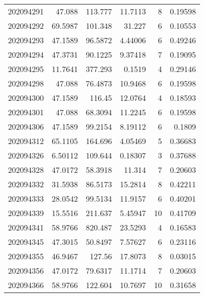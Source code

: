 \begin{tabular}{rrrrrr}
 202094291 &         47.088   &      113.777  &           11.7113  &           8 & 0.19598 \\
 202094292 &         69.5987  &      101.348  &           31.227   &           6 & 0.10553 \\
 202094293 &         47.1589  &       96.5872 &            4.44006 &           6 & 0.49246 \\
 202094294 &         47.3731  &       90.1225 &            9.37418 &           7 & 0.19095 \\
 202094295 &         11.7641  &      377.293  &            0.1519  &           4 & 0.29146 \\
 202094298 &         47.088   &       76.4873 &           10.9468  &           6 & 0.19598 \\
 202094300 &         47.1589  &      116.45   &           12.0764  &           4 & 0.18593 \\
 202094301 &         47.088   &       68.3094 &           11.2245  &           6 & 0.19598 \\
 202094306 &         47.1589  &       99.2154 &            8.19112 &           6 & 0.1809  \\
 202094312 &         65.1105  &      164.696  &            4.05469 &           5 & 0.36683 \\
 202094326 &          6.50112 &      109.644  &            0.18307 &           3 & 0.37688 \\
 202094328 &         47.0172  &       58.3918 &           11.314   &           7 & 0.20603 \\
 202094332 &         31.5938  &       86.5173 &           15.2814  &           8 & 0.42211 \\
 202094333 &         28.0542  &       99.5134 &           11.9157  &           6 & 0.40201 \\
 202094339 &         15.5516  &      211.637  &            5.45947 &          10 & 0.41709 \\
 202094341 &         58.9766  &      820.487  &           23.5293  &           4 & 0.16583 \\
 202094345 &         47.3015  &       50.8497 &            7.57627 &           6 & 0.23116 \\
 202094355 &         46.9467  &      127.56   &           17.8073  &           8 & 0.03015 \\
 202094356 &         47.0172  &       79.6317 &           11.1714  &           7 & 0.20603 \\
 202094366 &         58.9766  &      122.604  &           10.7697  &          10 & 0.31658 \\

\end{tabular}
